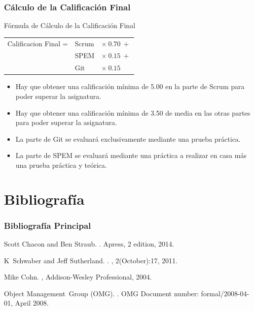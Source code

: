 \documentclass[animated,a4paper,slidestop,xcolor=pst,blue]{beamer}
\begin{document}
\begin{frame}[c]
	\frametitle{Cálculo de la Calificación Final}
	\begin{block}{Fórmula de Cálculo de la Calificación Final}
		\begin{tabular}{lll}
			Calificacion Final = & Scrum & $\times \ 0.70 \ + $ \\
                                 & SPEM  & $\times \ 0.15 \ + $ \\
                                 & Git   & $\times \ 0.15 \   $ \\
		\end{tabular}
	\end{block}
	\begin{itemize}
		\item<2-> Hay que obtener una calificación mínima de 5.00 en la parte de Scrum para poder superar la asignatura.
		\item<3-> Hay que obtener una calificación mínima de 3.50 de media en las otras partes para poder superar la asignatura.
        \item<4-> La parte de Git se evaluará exclusivamente mediante una prueba práctica.
        \item<5-> La parte de SPEM se evaluará mediante una práctica a realizar en casa más una prueba práctica y teórica.
	\end{itemize}
\end{frame}

\section{Bibliografía}

\begin{frame}[c]
    \frametitle{Bibliografía Principal}
    \begin{thebibliography}{1}

Scott Chacon and Ben Straub.
.
\newblock Apress, 2 edition, 2014.

K~Schwaber and Jeff Sutherland.
.
, 2(October):17, 2011.

Mike Cohn.
,
\newblock Addison-Wesley Professional, 2004.

\bibitem{}
Object Management~Group (OMG).
.
\newblock OMG Document number: formal/2008-04-01, April 2008.
\end{thebibliography}
\end{frame}
\end{document}
